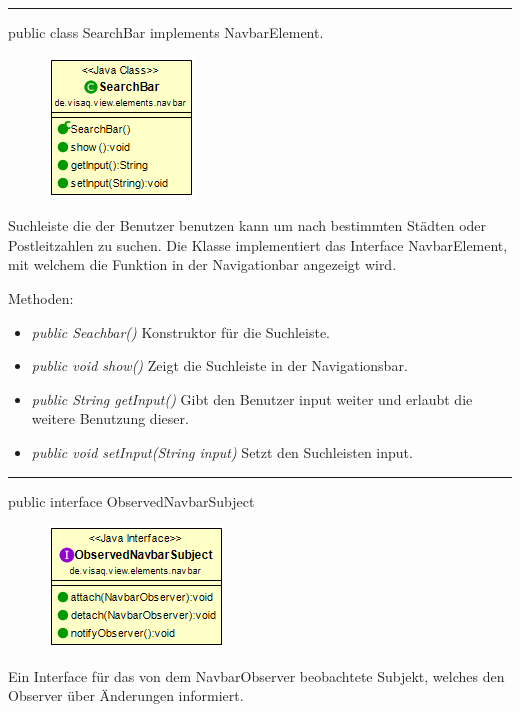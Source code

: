 \rule{\textwidth}{0.4pt} 
public class SearchBar implements NavbarElement.

\begin{minipage}{0.3\textwidth}
    \begin{figure}[H]
        \includegraphics[scale = 0.6]{media/frontend/view/de.view.elements.navbar/SearchbarClass.png}
    \end{figure}
    \end{minipage} \hfill
    \begin{minipage}{0.6\textwidth}
Suchleiste die der Benutzer benutzen kann um nach bestimmten Städten oder Postleitzahlen zu suchen. Die Klasse implementiert das Interface NavbarElement, mit welchem die Funktion in der Navigationbar angezeigt wird.
\end{minipage}

Methoden:
\begin{itemize} 
    \item \emph{public Seachbar()} Konstruktor für die Suchleiste.
    \item \emph{public void show()} Zeigt die Suchleiste in der Navigationsbar.
    \item \emph{public String getInput()} Gibt den Benutzer input weiter und erlaubt die weitere Benutzung dieser.
    \item \emph{public void setInput(String input)} Setzt den Suchleisten input.
\end{itemize}

\rule{\textwidth}{0.4pt} 
public interface ObservedNavbarSubject

\begin{minipage}{0.3\textwidth}
    \begin{figure}[H]
        \includegraphics[scale = 0.6]{media/frontend/view/de.view.elements.navbar/ObservedNavbarSubjectClass.png}
    \end{figure}
    \end{minipage} \hfill
\begin{minipage}{0.6\textwidth}
Ein Interface für das von dem NavbarObserver beobachtete Subjekt, welches den Observer über Änderungen informiert.
\end{minipage}

